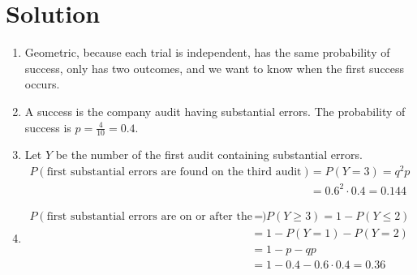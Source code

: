 \documentclass[11pt]{article}
\theoremstyle{definition}
\begin{document}
\section*{Solution}

\begin{enumerate}
	\item Geometric, because each trial is independent, has the same probability of success, only has two outcomes, and we want to know when the first success occurs.
	\item A success is the company audit having substantial errors. The probability of success is $p = \frac{4}{10} = 0.4$.
	\item
	Let $Y$ be the number of the first audit containing substantial errors.
		$$
			\begin{aligned}
				P(\text{first substantial errors are found on the third audit}) & = P(Y=3) = q^2 p \\
				& = 0.6^2 \cdot 0.4 = 0.144
			\end{aligned}
		$$
	\item
		$$
			\begin{aligned}
				P(\text{first substantial errors are on or after the third audit}) & = P(Y\geq 3) = 1 - P(Y \leq 2) \\
				& = 1 - P(Y = 1) - P(Y = 2) \\
				& = 1 - p - qp \\
				& = 1 - 0.4 - 0.6 \cdot 0.4 = 0.36
			\end{aligned}
		$$
\end{enumerate}
\end{document}
